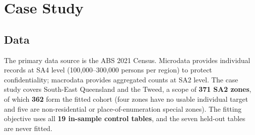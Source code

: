 \documentclass[review]{elsarticle}
\begin{document}
\FloatBarrier




\section{Case Study}
\subsection{Data} \label{sec:casestudy}
The primary data source is the ABS 2021 Census. Microdata provides individual records at SA4 level (100{,}000--300{,}000 persons per region) to protect confidentiality; macrodata provides aggregated counts at SA2 level. The case study covers South-East Queensland and the Tweed, a scope of \textbf{371 SA2 zones}, of which \textbf{362} form the fitted cohort (four zones have no usable individual target and five are non-residential or place-of-enumeration special zones). The fitting objective uses all \textbf{19 in-sample control tables}, and the seven held-out tables are never fitted. %
\end{document}

